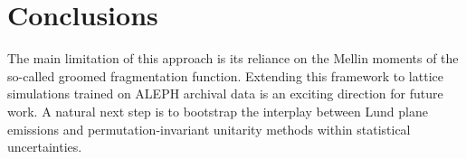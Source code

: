 \section{Conclusions}\label{sec:conclusions}

The main limitation of this approach is its reliance on the Mellin
moments of the so-called groomed fragmentation function. Extending this
framework to lattice simulations trained on ALEPH archival data is an
exciting direction for future work. A natural next step is to bootstrap
the interplay between Lund plane emissions and permutation-invariant
unitarity methods within statistical uncertainties.

